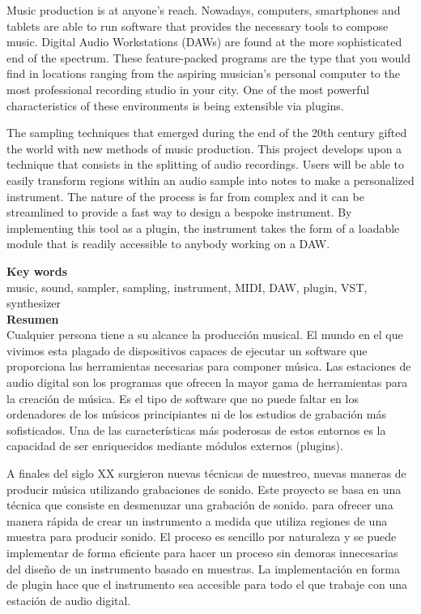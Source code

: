 \documentclass[12pt, a4paper, hidelinks]{article}
\begin{document}
	\normalsize
	Music production is at anyone's reach. Nowadays, computers, smartphones and tablets are able to run software that provides the necessary tools to compose music. Digital Audio Workstations (DAWs) are found at the more sophisticated end of the spectrum. These feature-packed programs are the type that you would find in locations ranging from the aspiring musician's personal computer to the most professional recording studio in your city. One of the most powerful characteristics of these environments is being extensible via plugins. \par	
	The sampling techniques that emerged during the end of the 20th century gifted the world with new methods of music production. This project develops upon a technique that consists in the splitting of audio recordings. Users will be able to easily transform regions within an audio sample into notes to make a personalized instrument. The nature of the process is far from complex and it can be streamlined to provide a fast way to design a bespoke instrument. By implementing this tool as a plugin, the instrument takes the form of a loadable module that is readily accessible to anybody working on a DAW.
	
	\vspace*{\fill}
	\large
	\textbf{Key words}\\
	
	\vspace{-1em}
	\normalsize	
	\noindent music, sound, sampler, sampling, instrument, MIDI, DAW, plugin, VST, synthesizer\\

	\newpage
	\huge
	\textbf{Resumen}\\
	
	\normalsize
	Cualquier persona tiene a su alcance la producción musical. El mundo en el que vivimos esta plagado de dispositivos capaces de ejecutar un software que proporciona las herramientas necesarias para componer música. Las estaciones de audio digital son los programas que ofrecen la mayor gama de herramientas para la creación de música. Es el tipo de software que no puede faltar en los ordenadores de los músicos principiantes ni de los estudios de grabación más sofisticados. Una de las características más poderosas de estos entornos es la capacidad de ser enriquecidos mediante módulos externos (plugins). \par 
	A finales del siglo XX surgieron nuevas técnicas de muestreo, nuevas maneras de producir música utilizando grabaciones de sonido. Este proyecto se basa en una técnica que consiste en desmenuzar una grabación de sonido. %
	para ofrecer una manera rápida de crear un instrumento a medida que utiliza regiones de una muestra para producir sonido. El proceso es sencillo por naturaleza y se puede implementar de forma eficiente para hacer un proceso sin demoras innecesarias del diseño de un instrumento basado en muestras. La implementación en forma de plugin hace que el instrumento sea accesible para todo el que trabaje con una estación de audio digital.
\end{document}
